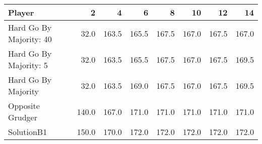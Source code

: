 \begin{tabular}{lrrrrrrr}
\toprule
                  Player &      2 &      4 &      6 &      8 &     10 &     12 &     14 \\
\midrule
 Hard Go By Majority: 40 &   32.0 &  163.5 &  165.5 &  167.5 &  167.0 &  167.5 &  167.0 \\
  Hard Go By Majority: 5 &   32.0 &  163.5 &  165.5 &  167.5 &  167.0 &  167.5 &  169.5 \\
     Hard Go By Majority &   32.0 &  163.5 &  169.0 &  167.5 &  167.0 &  167.5 &  169.5 \\
        Opposite Grudger &  140.0 &  167.0 &  171.0 &  171.0 &  171.0 &  171.0 &  171.0 \\
              SolutionB1 &  150.0 &  170.0 &  172.0 &  172.0 &  172.0 &  172.0 &  172.0 \\
\bottomrule
\end{tabular}
